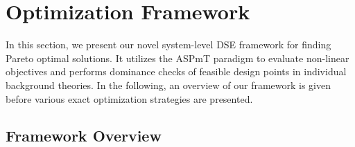 \section{Optimization Framework}
\label{sec:framework}
In this section, we present our novel system-level \acf{DSE} framework for finding Pareto optimal solutions. It utilizes the \ac{ASPmT} paradigm to evaluate non-linear objectives and performs dominance checks of feasible design points in individual background theories. In the following, an overview of our framework is given before various exact optimization strategies are presented. %


\subsection{Framework Overview}
\label{sec:overview}

